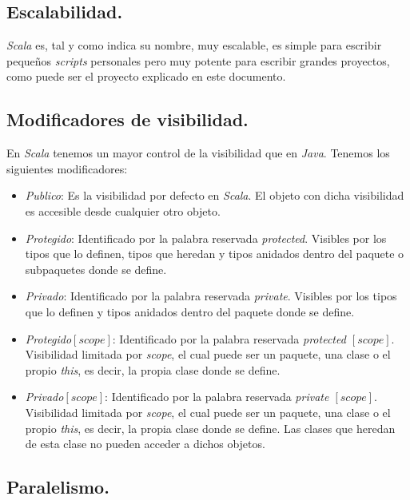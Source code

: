 \subsection{Escalabilidad.} \label{subsec:escalabilidad}

\textit{Scala} es, tal y como indica su nombre, muy escalable, es simple para escribir pequeños \textit{scripts} personales pero muy potente para escribir grandes proyectos, como puede ser el proyecto explicado en este documento.

\subsection{Modificadores de visibilidad.} \label{subsec:visibilidad}

En \textit{Scala} tenemos un mayor control de la visibilidad que en \textit{Java}. Tenemos los siguientes modificadores:

\begin{itemize}
	\item \textit{Publico}: Es la visibilidad por defecto en \textit{Scala}. El objeto con dicha visibilidad es accesible desde cualquier otro objeto.
	\item \textit{Protegido}: Identificado por la palabra reservada \textit{protected}. Visibles por los tipos que lo definen, tipos que heredan y tipos anidados dentro del paquete o subpaquetes donde se define.
	\item \textit{Privado}: Identificado por la palabra reservada \textit{private}. Visibles por los tipos que lo definen y tipos anidados dentro del paquete donde se define.
	\item \textit{Protegido$\left [ scope \right ]$}: Identificado por la palabra reservada \textit{protected $\left [ scope \right ]$}. Visibilidad limitada por \textit{scope}, el cual puede ser un paquete, una clase o el propio \textit{this}, es decir, la propia clase donde se define.
	\item \textit{Privado$\left [ scope \right ]$}: Identificado por la palabra reservada \textit{private $\left [ scope \right ]$}. Visibilidad limitada por \textit{scope}, el cual puede ser un paquete, una clase o el propio \textit{this}, es decir, la propia clase donde se define. Las clases que heredan de esta clase no pueden acceder a dichos objetos.
\end{itemize}

\subsection{Paralelismo.} \label{subsec:paralelismo}

